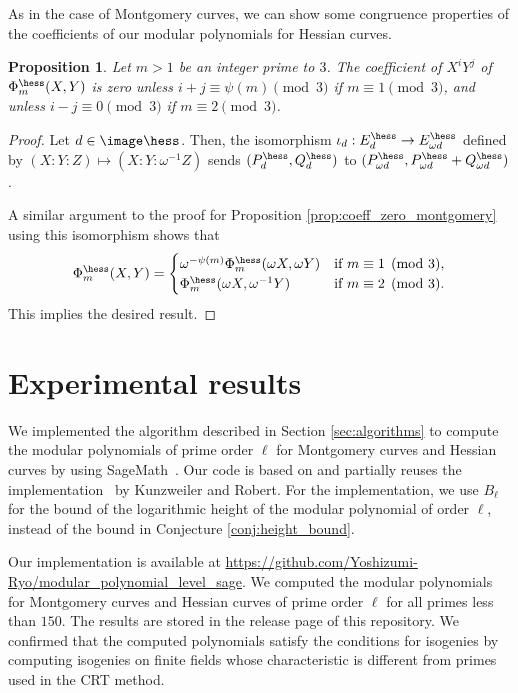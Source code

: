 \documentclass{amsart}
\newtheorem{proposition}[theorem]{Proposition}
\theoremstyle{definition}
\theoremstyle{remark}
\numberwithin{equation}{section}
\begin{document}
As in the case of Montgomery curves,
we can show some congruence properties of the coefficients
of our modular polynomials for Hessian curves.
\begin{proposition}\label{prop:coeff_zero_hessian}
    Let $m > 1$ be an integer prime to $3$.
    The coefficient of $X^i Y^j$ of $\Phi_m^{\hess}(X, Y)$ is zero
    unless $i + j \equiv \psi(m) \pmod{3}$ if $m \equiv 1 \pmod{3}$,
    and unless $i - j \equiv 0 \pmod{3}$ if $m \equiv 2 \pmod{3}$.
\end{proposition}
\begin{proof}
    Let $d \in \image\hess$.
    Then, the isomorphism $\iota_d : E_d^\hess \to E_{\omega d}^\hess$
    defined by $(X : Y : Z) \mapsto (X : Y : \omega^{-1}Z)$
    sends $(P_d^\hess, Q_d^\hess)$ to $(P_{\omega d}^\hess, P_{\omega d}^\hess + Q_{\omega d}^\hess)$.

    A similar argument to the proof for Proposition \ref{prop:coeff_zero_montgomery}
    using this isomorphism
    shows that
    \begin{equation*}
        \Phi_m^{\hess}(X, Y) = \begin{cases}
            \omega^{-\psi(m)}\Phi_m^{\hess}(\omega X, \omega Y) & \text{if } m \equiv 1 \pmod{3},\\
            \Phi_m^{\hess}(\omega X, \omega^{-1} Y) & \text{if } m \equiv 2 \pmod{3}.
            \end{cases}
    \end{equation*}
    This implies the desired result.
\end{proof}

\section{Experimental results}\label{sec:experiment}
We implemented the algorithm described in Section \ref{sec:algorithms}
to compute the modular polynomials of prime order $\ell$ for Montgomery curves and Hessian curves
by using SageMath~\cite{sagemath}.
Our code is based on and partially reuses the implementation~\cite{KR2024implementation}
by Kunzweiler and Robert.
For the implementation,
we use $B_\ell$ for the bound of the logarithmic height of
the modular polynomial of order $\ell$, instead of
the bound in Conjecture \ref{conj:height_bound}.

Our implementation is available at
\url{https://github.com/Yoshizumi-Ryo/modular_polynomial_level_sage}.
We computed the modular polynomials for Montgomery curves
and Hessian curves of prime order $\ell$ for all primes less than $150$.
The results are stored in the release page of this repository.
We confirmed that
the computed polynomials satisfy the conditions for isogenies
by computing isogenies on finite fields whose characteristic is
different from primes used in the CRT method.
\end{document}
